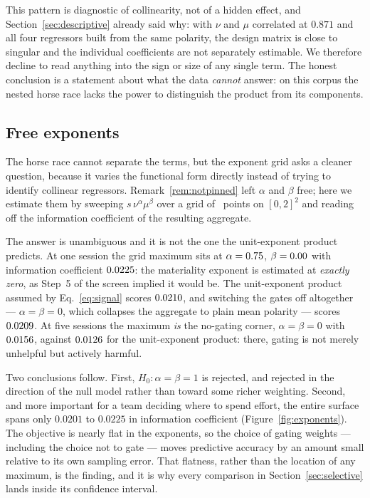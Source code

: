 \documentclass[preprint,12pt,authoryear]{elsarticle}
\theoremstyle{plain}
\theoremstyle{remark}
\begin{document}
This pattern is diagnostic of collinearity, not of a hidden effect, and
Section~\ref{sec:descriptive} already said why: with $\nu$ and $\mu$ correlated
at $0.871$ and all four regressors built from the same polarity, the design
matrix is close to singular and the individual coefficients are not separately
estimable. We therefore decline to read anything into the sign or size of any
single term. The honest conclusion is a statement about what the data
\emph{cannot} answer: on this corpus the nested horse race lacks the power to
distinguish the product from its components.



\subsection{Free exponents}\label{sec:exponents}

The horse race cannot separate the terms, but the exponent grid asks a cleaner
question, because it varies the functional form directly instead of trying to
identify collinear regressors. Remark~\ref{rem:notpinned} left $\alpha$ and
$\beta$ free; here we estimate them by sweeping $s\,\nu^{\alpha}\mu^{\beta}$ over
a grid of \GridPerHorizon\ points on $[0,2]^2$ and reading off the information
coefficient of the resulting aggregate.

The answer is unambiguous and it is not the one the unit-exponent product
predicts. At one session the grid maximum sits at $\alpha=0.75$,
$\beta=0.00$ with information coefficient $0.0225$: the materiality
exponent is estimated at \emph{exactly zero}, as Step~5 of the screen implied it
would be. The unit-exponent product assumed by Eq.~\eqref{eq:signal} scores
$0.0210$, and switching the gates off altogether --- $\alpha=\beta=0$, which
collapses the aggregate to plain mean polarity --- scores $0.0209$. At five
sessions the maximum \emph{is} the no-gating corner, $\alpha=\beta=0$ with
$0.0156$, against $0.0126$ for the unit-exponent product: there,
gating is not merely unhelpful but actively harmful.

Two conclusions follow. First, $H_0\!:\alpha=\beta=1$ is rejected, and rejected
in the direction of the null model rather than toward some richer weighting.
Second, and more important for a team deciding where to spend effort, the entire
surface spans only $0.0201$ to $0.0225$ in information coefficient
(Figure~\ref{fig:exponents}). The objective is nearly flat in the exponents, so
the choice of gating weights --- including the choice not to gate --- moves
predictive accuracy by an amount small relative to its own sampling error. That
flatness, rather than the location of any maximum, is the finding, and it is why
every comparison in Section~\ref{sec:selective} lands inside its confidence
interval.
\end{document}
